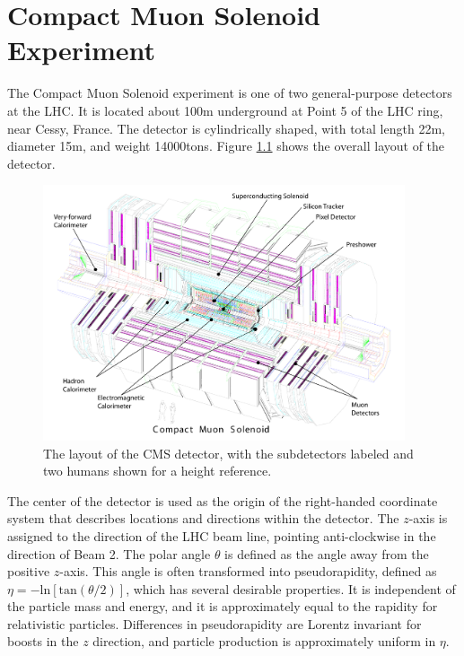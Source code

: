 \chapter{Compact Muon Solenoid Experiment
\label{ch:cmsexperiment}}
\setcounter{section}{-1}

The Compact Muon Solenoid experiment is one of two general-purpose detectors at the LHC. It is located about 100\unit{m} underground at Point 5 of the LHC ring, near Cessy, France. The detector is cylindrically shaped, with total length 22\unit{m}, diameter 15\unit{m}, and weight 14000\unit{tons}. Figure \ref{fig:cms-overall} shows the overall layout of the detector.

\begin{figure}[hbt]
\begin{center}
\includegraphics[width=0.95\textwidth]{figures/cms_complete_labelled.pdf}
\caption{The layout of the CMS detector, with the subdetectors labeled and two humans shown for a height reference.}
\label{fig:cms-overall}
\end{center}
\end{figure}

The center of the detector is used as the origin of the right-handed coordinate system that describes locations and directions within the detector. The $z$-axis is assigned to the direction of the LHC beam line, pointing anti-clockwise in the direction of Beam 2. The polar angle $\theta$ is defined as the angle away from the positive $z$-axis. This angle is often transformed into pseudorapidity, defined as $\eta = -\text{ln}[\text{tan}(\theta/2)]$, which has several desirable properties. It is independent of the particle mass and energy, and it is approximately equal to the rapidity for relativistic particles. Differences in pseudorapidity are Lorentz invariant for boosts in the $z$ direction, and particle production is approximately uniform in $\eta$.

